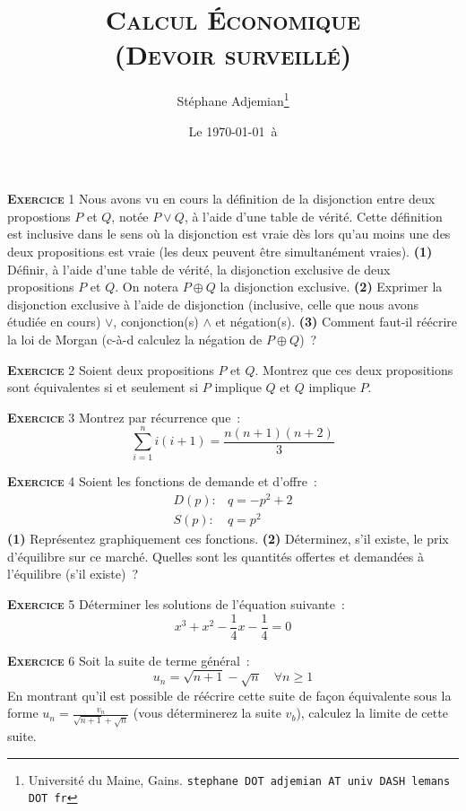 \documentclass[10pt,a4paper,notitlepage]{article}
\newcommand{\exercice}[1]{\textsc{\textbf{Exercice}} #1}
\providecommand{\lxor}{\oplus}
\begin{document}
\title{\textsc{Calcul Économique\\ \small{(Devoir surveillé)}}}
\author{Stéphane Adjemian\thanks{Université du Maine, Gains. \texttt{stephane DOT adjemian AT univ DASH lemans DOT fr}}}
\date{Le \today\ à \thistime}

\maketitle

\exercice{1} Nous avons vu en cours la définition de la disjonction
entre deux propostions $P$ et $Q$, notée $P \lor Q$, à l'aide d'une
table de vérité. Cette définition est inclusive dans le sens où la
disjonction est vraie dès lors qu'au moins une des deux propositions
est vraie (les deux peuvent être simultanément vraies). \textbf{(1)}
Définir, à l'aide d'une table de vérité, la disjonction exclusive
de deux propositions $P$ et $Q$. On notera $P \lxor Q$ la
disjonction exclusive. \textbf{(2)} Exprimer la disjonction exclusive à
l'aide de disjonction (inclusive, celle que nous avons étudiée en
cours) $\lor$, conjonction(s) $\land$ et négation(s). \textbf{(3)}
Comment faut-il réécrire la loi de Morgan (c-à-d calculez la négation de
$P\lxor Q$) ?

\bigskip

\exercice{2} Soient deux propositions $P$ et $Q$. Montrez que ces deux
propositions sont équivalentes si et seulement si $P$ implique $Q$ et $Q$
implique $P$.

\bigskip

\exercice{3} Montrez par récurrence que~:
\[
  \sum_{i=1}^n i(i+1) = \frac{n(n+1)(n+2)}{3}
\]

\bigskip

\exercice{4} Soient les fonctions de demande et d'offre~:
\[
\begin{split}
  D(p):& q = -p^2+2\\
  S(p):& q = p^2
\end{split}
\] 
\textbf{(1)} Représentez graphiquement ces fonctions. \textbf{(2)} Déterminez,
s'il existe, le prix d'équilibre sur ce marché. Quelles sont les quantités
offertes et demandées à l'équilibre (s'il existe)~?

\bigskip

\exercice{5} Déterminer les solutions de l'équation suivante :
\[
x^3+x^2-\frac{1}{4}x-\frac{1}{4} = 0
\]

\exercice{6} Soit la suite de terme général :
\[
u_n = \sqrt{n+1}-\sqrt{n}\quad\forall n\geq 1
\]
En montrant qu'il est possible de réécrire cette suite de façon équivalente sous
la forme $u_n = \frac{v_n}{\sqrt{n+1}+\sqrt{n}}$ (vous déterminerez la suite
$v_b$), calculez la limite de cette suite.
\end{document}
